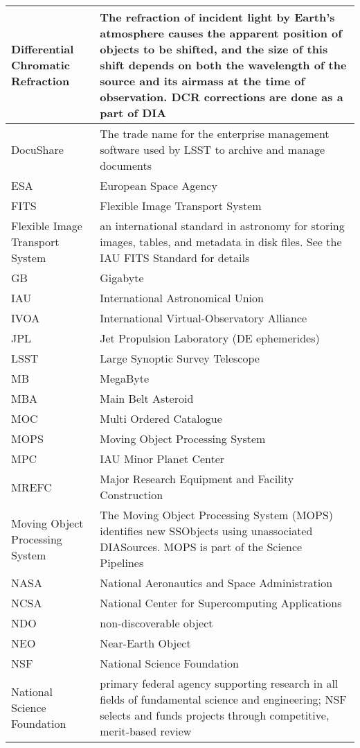 \begin{longtable}{|p{}|p{}|}
Differential Chromatic Refraction & The refraction of incident light by Earth's atmosphere causes the apparent position of objects to be shifted, and the size of this shift depends on both the wavelength of the source and its \gls{airmass} at the time of observation. \gls{DCR} corrections are done as a part of \gls{DIA} \\\hline
DocuShare & The trade name for the enterprise management software used by \gls{LSST} to archive and manage documents \\\hline
ESA & European Space Agency \\\hline
FITS & \gls{Flexible Image Transport System} \\\hline
Flexible Image Transport System & an international standard in astronomy for storing images, tables, and \gls{metadata} in disk files. See the \gls{IAU} \gls{FITS} Standard for details \\\hline
GB & Gigabyte \\\hline
IAU & International Astronomical Union \\\hline
IVOA & International Virtual-Observatory Alliance \\\hline
JPL & Jet Propulsion Laboratory (DE ephemerides) \\\hline
LSST & Large Synoptic Survey Telescope \\\hline
MB & MegaByte \\\hline
MBA & Main Belt Asteroid \\\hline
MOC & Multi Ordered Catalogue \\\hline
MOPS & \gls{Moving Object Processing System} \\\hline
MPC & \gls{IAU} Minor Planet \gls{Center} \\\hline
MREFC & \gls{Major Research Equipment and Facility Construction} \\\hline
Moving Object Processing System & The \gls{Moving Object Processing System} (\gls{MOPS}) identifies new SSObjects using unassociated DIASources. \gls{MOPS} is part of the \gls{Science Pipelines} \\\hline
NASA & National Aeronautics and Space Administration \\\hline
NCSA & National \gls{Center} for Supercomputing Applications \\\hline
NDO & non-discoverable object \\\hline
NEO & Near-Earth \gls{Object} \\\hline
NSF & \gls{National Science Foundation} \\\hline
National Science Foundation & primary federal agency supporting research in all fields of fundamental science and engineering; \gls{NSF} selects and funds projects through competitive, merit-based review \\\hline

\end{longtable}
